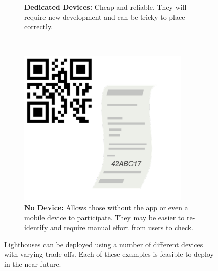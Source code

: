 \begin{figure}[h]
\begin{subfigure}[t]{0.3\textwidth}
        \caption{\textbf{Dedicated Devices:} Cheap and reliable. They will require new development and can be tricky to place correctly.}
    \end{subfigure}
    ~
    \begin{subfigure}[t]{0.3\textwidth}
        \centering
        \includegraphics[width=0.9\textwidth]{figs/physicalRPI.pdf}
        \caption{\textbf{No Device:} Allows those without the app or even a mobile device to participate. They may be easier to re-identify and require manual effort from users to check.}
    \end{subfigure}
    \caption{Lighthouses can be deployed using a number of different devices with varying trade-offs. Each of these examples is feasible to deploy in the near future.}
    \label{fig:lighthouseDevices}
\end{figure}

